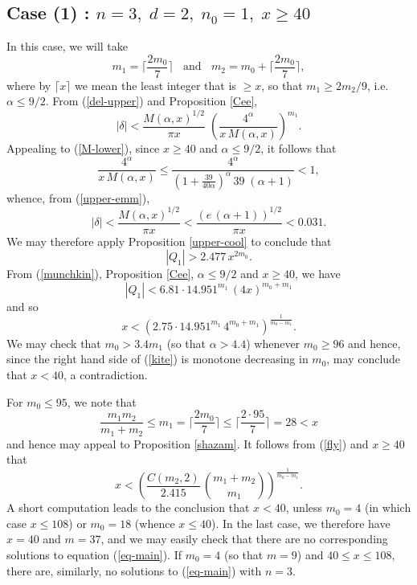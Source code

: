 \subsection{Case (1) : $n=3, \; d=2, \;  n_0=1, \; x \geq 40$}

In this case, we will take
$$
m_1 = \Big\lceil \frac{2m_0}{7} \Big\rceil \; \; \mbox{ and } \; \; m_2 = m_0+  \Big\lceil \frac{2m_0}{7} \Big\rceil,
$$
where by $\lceil x \rceil$ we mean the least integer that is $\geq x$, so that $m_1 \geq 2 m_2/9$, i.e. $\alpha \leq 9/2$. 
From (\ref{del-upper}) and   Proposition \ref{Cee}, 
$$
|\delta| < \frac{M(\alpha,x)^{1/2}}{\pi x} \; \left( \frac{4^{\alpha} }{x \, M(\alpha,x)} \right)^{m_1}.
$$
Appealing to (\ref{M-lower}), since $x \geq 40$ and $\alpha \leq 9/2$, it follows that 
$$
\frac{4^{\alpha} }{x \, M(\alpha,x)} \leq \frac{4^{\alpha} }{\left( 1 + \frac{39}{40 \alpha} \right)^\alpha \, 39 \; (\alpha+1)} < 1,
$$
whence, from (\ref{upper-emm}), 
$$
|\delta| < \frac{M(\alpha,x)^{1/2}}{\pi x} < \frac{(e \, (\alpha+1))^{1/2}}{\pi x}  < 0.031.
$$
We may therefore apply Proposition \ref{upper-cool} to conclude that
\begin{equation} \label{fly}
 |Q_1| > 2.477 \, x^{2m_0}.
\end{equation}
From (\ref{munchkin}), Proposition \ref{Cee}, $\alpha \leq 9/2$ and $x \geq 40$, we have
$$
|Q_1| < 6.81  \cdot 14.951^{m_1}  \, (4x)^{m_0+m_1} 
$$
and so
\begin{equation} \label{kite}
x < \left( 2.75 \cdot 14.951^{m_1}  \, 4^{m_0+m_1} \right)^{\frac{1}{m_0-m_1}}.
\end{equation}
We may check that $m_0 > 3.4 m_1$ (so that $\alpha > 4.4$) whenever $m_0 \geq 96$ and hence, since the right hand side of (\ref{kite}) is monotone decreasing in $m_0$, may conclude that $x < 40$, a contradiction. 

For $m_0 \leq 95$, we note that
$$
\frac{m_1m_2}{m_1+m_2} \leq m_1 = \Big\lceil \frac{2m_0}{7} \Big\rceil \leq   \Big\lceil \frac{2 \cdot 95}{7} \Big\rceil = 28 < x
$$
and hence may
appeal to Proposition \ref{shazam}.
It follows from (\ref{fly}) and $x \geq 40$ that
$$
x < \left( \frac{C(m_2,2)}{2.415} \, \binom{m_1+m_2}{m_1} \right)^{\frac{1}{m_0-m_1}}.
$$
A short computation leads to the conclusion that $x < 40$, unless $m_0 =4$ (in which case $x \leq 108$) or $m_0=18$ (whence $x \leq 40$). In the last case, we therefore have $x=40$ and $m=37$, and we may easily check that there are no corresponding solutions to equation (\ref{eq-main}).
 If $m_0=4$ (so that $m=9$) and $40 \leq x \leq 108$, there are, similarly, no solutions to (\ref{eq-main}) with $n=3$. 

